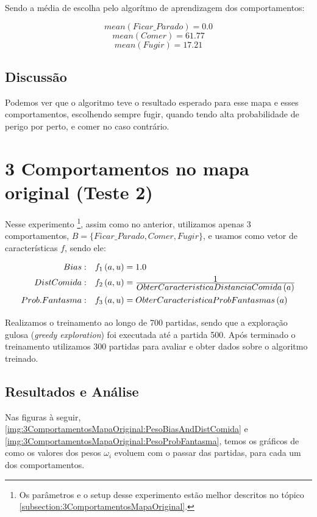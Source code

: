 Sendo a média de escolha pelo algorítmo de aprendizagem dos comportamentos:

$$ mean \left( Ficar\_Parado \right) = 0.0 $$
$$ mean \left( Comer \right) = 61.77 $$
$$ mean \left( Fugir \right) = 17.21 $$


\subsection{Discussão}

Podemos ver que o algoritmo teve o resultado esperado para esse mapa e esses comportamentos, escolhendo sempre fugir, quando tendo alta probabilidade de perigo por perto, e comer no caso contrário.


\section{3 Comportamentos no mapa original (Teste 2)}

Nesse experimento%
\footnote{Os parâmetros e o setup desse experimento estão melhor descritos no tópico \ref{subsection:3ComportamentosMapaOriginal}.%
}, assim como no anterior, utilizamos apenas 3 comportamentos, $ B = \{Ficar\_Parado, Comer, Fugir\} $, e usamos como vetor de características $ f $, sendo ele:
\begin{equation}
	\renewcommand\arraystretch{1.5}
	\begin{array}{r l}
		Bias: & f_1 \left( a, u \right) = 1.0 \\
		Dist Comida: & f_2 \left( a, u \right) = \frac{\displaystyle 1}{\displaystyle ObterCaracteristicaDistanciaComida \left( a \right)} \\
		Prob. Fantasma: & f_3 \left( a, u \right) = ObterCaracteristicaProbFantasmas \left( a \right)
	\end{array}
\end{equation}

Realizamos o treinamento ao longo de 700 partidas, sendo que a exploração gulosa (\textit{greedy exploration}) foi executada até a partida 500. Após terminado o treinamento utilizamos 300 partidas para avaliar e obter dados sobre o algoritmo treinado.


\subsection{Resultados e Análise}

Nas figuras à seguir, \ref{img:3ComportamentosMapaOriginal:PesoBiasAndDistComida} e \ref{img:3ComportamentosMapaOriginal:PesoProbFantasma}, temos os gráficos de como os valores dos pesos $ \omega_i $ evoluem com o passar das partidas, para cada um dos comportamentos.


